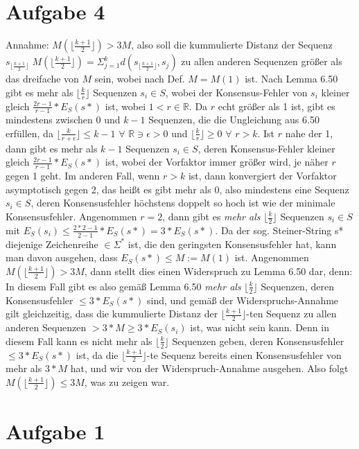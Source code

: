 \documentclass[a4paper,10pt,oneside,reqno]{scrartcl}
\begin{document}
\section*{Aufgabe 4}%
Annahme: $M(\lfloor \frac{k+1}{2}\rfloor) > 3M$, also soll die kummulierte Distanz der Sequenz $s_{\lfloor \frac{k+1}{2}\rfloor}$
$M(\lfloor \frac{k+1}{2}\rfloor) = \Sigma_{j=1}^k d(s_{\lfloor \frac{k+1}{2}\rfloor}, s_j)$ zu allen anderen Sequenzen größer als
das dreifache von $M$ sein, wobei nach Def. $M = M(1)$ ist.
Nach Lemma 6.50 gibt es mehr als $\lfloor \frac{k}{r}\rfloor$ Sequenzen $s_i \in S$, wobei der Konsensus-Fehler von $s_i$ kleiner gleich
$\frac{2r-1}{r-1}*E_S(s*)$ ist, wobei $1<r \in \mathbb{R}$. Da $r$ echt größer als 1 ist, gibt es mindestens zwischen 0 und $k-1$ Sequenzen,
die die Ungleichung aus 6.50 erfüllen, da $\lfloor \frac{k}{r+\epsilon}\rfloor \leq k-1$  $\forall$  $\mathbb{R} \ni \epsilon > 0$ und
$\lfloor \frac{k}{r}\rfloor \geq 0$ $\forall$ $r>k$.\newline
Ist $r$ nahe der 1, dann gibt es mehr als $k-1$ Sequenzen $s_i \in S$, deren Konsensus-Fehler kleiner gleich $\frac{2r-1}{r-1}*E_S(s*)$ ist,
wobei der Vorfaktor immer größer wird, je näher $r$ gegen 1 geht. Im anderen Fall, wenn $r>k$ ist, dann konvergiert der Vorfaktor
asymptotisch gegen 2, das heißt es gibt mehr als 0, also mindestens eine Sequenz $s_i \in S$, deren Konsensusfehler höchstens doppelt so hoch
ist wie der minimale Konsensusfehler.\newline
Angenommen $r=2$, dann gibt es \textit{mehr als} $\lfloor \frac{k}{2}\rfloor$ Sequenzen $s_i \in S$ mit $E_S(s_i) \leq \frac{2*2-1}{2-1}*E_S(s*)
= 3*E_S(s*)$. Da der sog. Steiner-String s* diejenige Zeichenreihe $\in \Sigma^*$ ist, die den geringsten Konsensusfehler hat, kann man davon
ausgehen, dass $E_S(s*) \leq M := M(1)$ ist.
Angenommen $M(\lfloor \frac{k+1}{2}\rfloor) > 3M$, dann stellt dies einen Widerspruch zu Lemma 6.50 dar, denn:\newline
In diesem Fall gibt es also gemäß Lemma 6.50 \textit{mehr als} $\lfloor \frac{k}{2}\rfloor$ Sequenzen, deren Konsensusfehler $\leq 3*E_S(s*)$ sind, und gemäß
der Widerspruchs-Annahme gilt gleichzeitig, dass die kummulierte Distanz der  $\lfloor \frac{k+1}{2}\rfloor$-ten Sequenz zu allen anderen
Sequenzen $>3*M \geq 3*E_S(s_i)$ ist, was nicht sein kann. Denn in diesem Fall kann es nicht mehr als $\lfloor \frac{k}{2}\rfloor$ Sequenzen
geben, deren Konsensusfehler $\leq 3*E_S(s*)$  ist, da die $\lfloor \frac{k+1}{2}\rfloor$-te Sequenz bereits einen Konsensusfehler von
mehr als $3*M$ hat, und wir von der Widerspruch-Annahme ausgehen.\newline
Also folgt $M(\lfloor \frac{k+1}{2}\rfloor) \leq 3M$, was zu zeigen war.

\section*{Aufgabe 1}%





 
\end{document}
